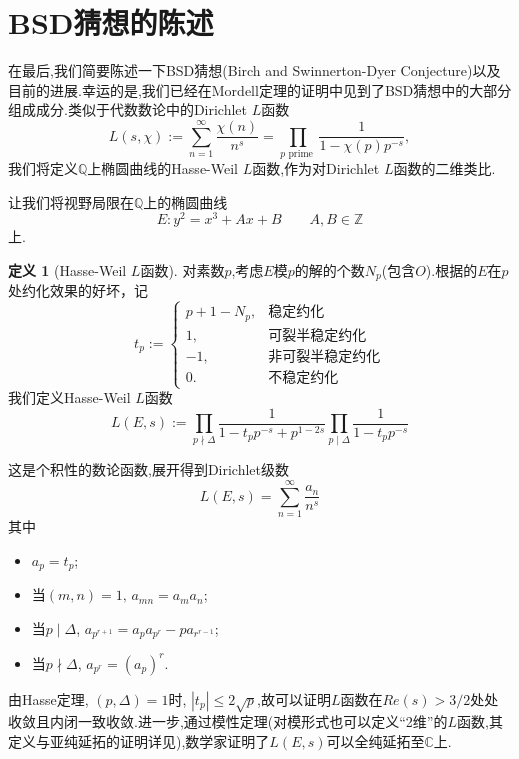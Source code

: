 \documentclass[12pt,A4paper,oneside,reqno]{amsart}
\numberwithin{equation}{section}
\theoremstyle{definition}
\newtheorem{defn}[theorem]{定义}
\theoremstyle{plain}
\theoremstyle{plain}
\numberwithin{equation}{section}
\theoremstyle{remark}
\begin{document}
\section{BSD猜想的陈述}
在最后,我们简要陈述一下BSD猜想(Birch and Swinnerton-Dyer Conjecture)以及目前的进展.幸运的是,我们已经在Mordell定理的证明中见到了BSD猜想中的大部分组成成分.类似于代数数论中的Dirichlet $L$函数
$$L(s,\chi):=\sum_{n=1}^{\infty}\frac{\chi(n)}{n^s}=\prod_{p \text{ prime }} \frac{1}{1-\chi(p)p^{-s}}, $$
我们将定义$\mathbb{Q}$上椭圆曲线的Hasse-Weil $L$函数,作为对Dirichlet $L$函数的二维类比.

让我们将视野局限在$\mathbb{Q}$上的椭圆曲线
$$E:y^2=x^3+Ax+B \qquad A,B \in \mathbb{Z}$$
上.
\begin{defn}[Hasse-Weil $L$函数]
	对素数$p$,考虑$E$模$p$的解的个数$N_p$(包含$O$).根据的$E$在$p$处约化效果的好坏，记
	$$t_p:=\begin{cases}
	p+1-N_p, & \text{稳定约化}\\
	1, & \text{可裂半稳定约化}\\
	-1, & \text{非可裂半稳定约化}\\
	0. & \text{不稳定约化}
	\end{cases}$$
	我们定义Hasse-Weil $L$函数
	$$L(E,s):= \prod_{p \nmid \Delta} \frac{1}{1-t_pp^{-s}+p^{1-2s}}\prod_{p \mid \Delta} \frac{1}{1-t_pp^{-s}}$$
\end{defn}
这是个积性的数论函数,展开得到Dirichlet级数
$$L(E,s)=\sum_{n=1}^{\infty}\frac{a_n}{n^s}$$
其中
\begin{itemize}
	\item $a_p=t_p$;
	\item 当$(m,n)=1,\,a_{mn}=a_ma_n$;
	\item 当$p \mid \Delta$, $a_{p^{r+1}}=a_pa_{p^r}-pa_{r^{r-1}}$;
	\item []当$p \nmid \Delta$, $a_{p^{r}}=(a_p)^r$.
\end{itemize}
由Hasse定理, $(p,\Delta)=1$时, $|t_p| \leqslant 2\sqrt{p}$,故可以证明$L$函数在$Re(s)>3/2$处处收敛且内闭一致收敛.进一步,通过模性定理\cite{breuil2001modularity}(对模形式也可以定义“2维”的$L$函数,其定义与亚纯延拓的证明详见\cite[p32-33]{bump1998automorphic}),数学家证明了$L(E,s)$可以全纯延拓至$\mathbb{C}$上.
\end{document}
